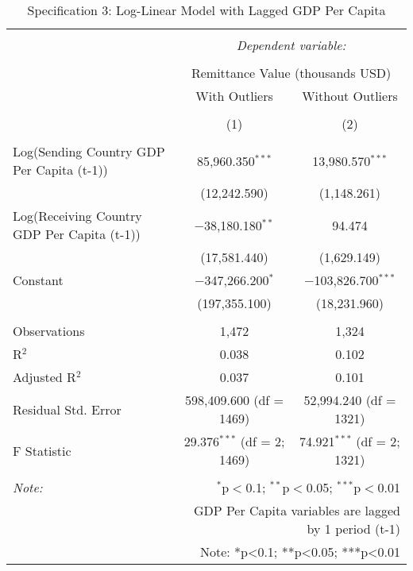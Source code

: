 
\begin{table}[!htbp] \centering 
  \caption{Specification 3: Log-Linear Model with Lagged GDP Per Capita} 
  \label{} 
\begin{tabular}{@{\extracolsep{5pt}}lcc} 
\\[-1.8ex]\hline 
\hline \\[-1.8ex] 
 & \multicolumn{2}{c}{\textit{Dependent variable:}} \\ 
\cline{2-3} 
\\[-1.8ex] & \multicolumn{2}{c}{Remittance Value (thousands USD)} \\ 
 & With Outliers & Without Outliers \\ 
\\[-1.8ex] & (1) & (2)\\ 
\hline \\[-1.8ex] 
 Log(Sending Country GDP Per Capita (t-1)) & 85,960.350$^{***}$ & 13,980.570$^{***}$ \\ 
  & (12,242.590) & (1,148.261) \\ 
  Log(Receiving Country GDP Per Capita (t-1)) & $-$38,180.180$^{**}$ & 94.474 \\ 
  & (17,581.440) & (1,629.149) \\ 
  Constant & $-$347,266.200$^{*}$ & $-$103,826.700$^{***}$ \\ 
  & (197,355.100) & (18,231.960) \\ 
 \hline \\[-1.8ex] 
Observations & 1,472 & 1,324 \\ 
R$^{2}$ & 0.038 & 0.102 \\ 
Adjusted R$^{2}$ & 0.037 & 0.101 \\ 
Residual Std. Error & 598,409.600 (df = 1469) & 52,994.240 (df = 1321) \\ 
F Statistic & 29.376$^{***}$ (df = 2; 1469) & 74.921$^{***}$ (df = 2; 1321) \\ 
\hline 
\hline \\[-1.8ex] 
\textit{Note:}  & \multicolumn{2}{r}{$^{*}$p$<$0.1; $^{**}$p$<$0.05; $^{***}$p$<$0.01} \\ 
 & \multicolumn{2}{r}{GDP Per Capita variables are lagged by 1 period (t-1)} \\ 
 & \multicolumn{2}{r}{Note: *p<0.1; **p<0.05; ***p<0.01} \\ 
\end{tabular} 
\end{table} 
